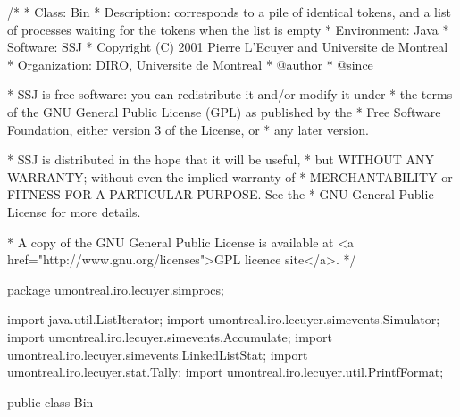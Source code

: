 \begin{code}
\begin{hide}
/*
 * Class:        Bin
 * Description:  corresponds to a pile of identical tokens, and a list of
                 processes waiting for the tokens when the list is empty
 * Environment:  Java
 * Software:     SSJ 
 * Copyright (C) 2001  Pierre L'Ecuyer and Universite de Montreal
 * Organization: DIRO, Universite de Montreal
 * @author       
 * @since

 * SSJ is free software: you can redistribute it and/or modify it under
 * the terms of the GNU General Public License (GPL) as published by the
 * Free Software Foundation, either version 3 of the License, or
 * any later version.

 * SSJ is distributed in the hope that it will be useful,
 * but WITHOUT ANY WARRANTY; without even the implied warranty of
 * MERCHANTABILITY or FITNESS FOR A PARTICULAR PURPOSE.  See the
 * GNU General Public License for more details.

 * A copy of the GNU General Public License is available at
   <a href="http://www.gnu.org/licenses">GPL licence site</a>.
 */
\end{hide}
package umontreal.iro.lecuyer.simprocs;
\begin{hide}
import java.util.ListIterator;
import umontreal.iro.lecuyer.simevents.Simulator;
import umontreal.iro.lecuyer.simevents.Accumulate;
import umontreal.iro.lecuyer.simevents.LinkedListStat;
import umontreal.iro.lecuyer.stat.Tally;
import umontreal.iro.lecuyer.util.PrintfFormat;
\end{hide}

public class Bin \begin{hide} {

   private static final int FIFO  = 1;
   private static final int LIFO  = 2;

    // Variables

        private ProcessSimulator sim;
        private String name;
        private int available = 0;
        private int policy = FIFO;
        private LinkedListStat<UserRecord> waitingList;
        private ListIterator<UserRecord> iter;
        private Accumulate statAvail;
        private boolean stats;
        private double     initStatTime;

\end{hide}\end{code}

